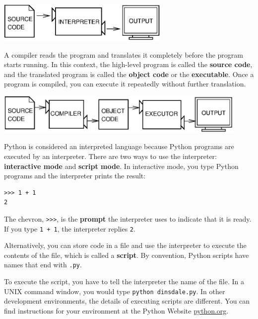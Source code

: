 \documentclass[10pt]{book}
\begin{document}
\beforefig
\centerline{\includegraphics[height=0.77in]{figs/interpret.eps}}
\afterfig


A compiler reads the program and translates it completely before the
program starts running.  In this context, the high-level program is
called the {\bf source code}, and the translated program is called the
{\bf object code} or the {\bf executable}.  Once a program is
compiled, you can execute it repeatedly without further translation.

\beforefig
\centerline{\includegraphics[height=0.77in]{figs/compile.eps}}
\afterfig

Python is considered an interpreted language because Python programs
are executed by an interpreter.  There are two ways to use the
interpreter: {\bf interactive mode} and {\bf script mode}. In
interactive mode, you type Python programs and the interpreter prints
the result:


\beforeverb
\begin{verbatim}
>>> 1 + 1
2
\end{verbatim}
\afterverb
%
The chevron, {\tt >>>}, is the
{\bf prompt} the interpreter uses to indicate that it is ready.  If
you type {\tt 1 + 1}, the interpreter replies {\tt 2}.


Alternatively, you can store code in a file and use the interpreter to
execute the contents of the file, which is called a {\bf script}.  By
convention, Python scripts have names that end with {\tt .py}.


To execute the script, you have to tell the interpreter the name of
the file.  In a UNIX command window, you would type {\tt python
dinsdale.py}.  In other development environments, the details of
executing scripts are different.  You can find instructions for
your environment at the Python Website \url{python.org}.
\end{document}

